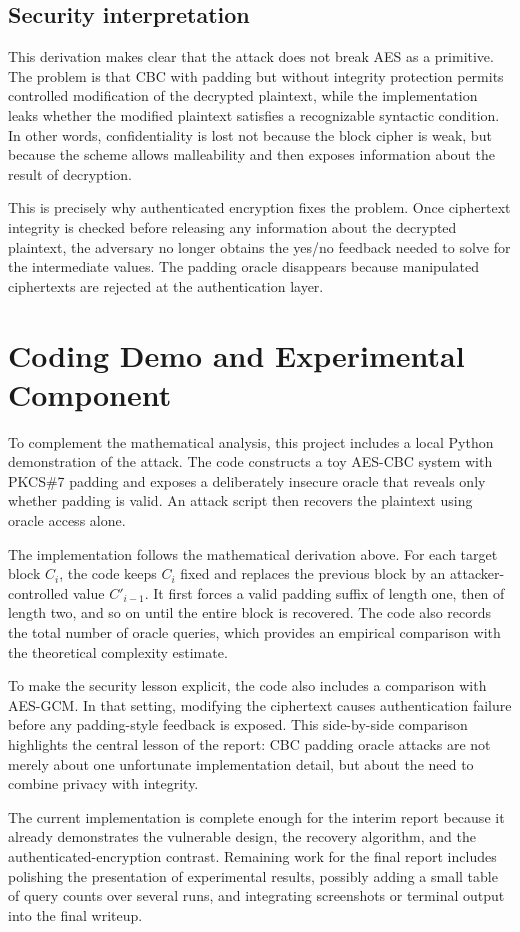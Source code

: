 \subsection{Security interpretation}

This derivation makes clear that the attack does not break AES as a primitive. The problem is that CBC with padding but without integrity protection permits controlled modification of the decrypted plaintext, while the implementation leaks whether the modified plaintext satisfies a recognizable syntactic condition. In other words, confidentiality is lost not because the block cipher is weak, but because the scheme allows malleability and then exposes information about the result of decryption.

This is precisely why authenticated encryption fixes the problem. Once ciphertext integrity is checked before releasing any information about the decrypted plaintext, the adversary no longer obtains the yes/no feedback needed to solve for the intermediate values. The padding oracle disappears because manipulated ciphertexts are rejected at the authentication layer.

\section{Coding Demo and Experimental Component}

To complement the mathematical analysis, this project includes a local Python demonstration of the attack. The code constructs a toy AES-CBC system with PKCS\#7 padding and exposes a deliberately insecure oracle that reveals only whether padding is valid. An attack script then recovers the plaintext using oracle access alone.

The implementation follows the mathematical derivation above. For each target block $C_i$, the code keeps $C_i$ fixed and replaces the previous block by an attacker-controlled value $C'_{i-1}$. It first forces a valid padding suffix of length one, then of length two, and so on until the entire block is recovered. The code also records the total number of oracle queries, which provides an empirical comparison with the theoretical complexity estimate.

To make the security lesson explicit, the code also includes a comparison with AES-GCM. In that setting, modifying the ciphertext causes authentication failure before any padding-style feedback is exposed. This side-by-side comparison highlights the central lesson of the report: CBC padding oracle attacks are not merely about one unfortunate implementation detail, but about the need to combine privacy with integrity.

The current implementation is complete enough for the interim report because it already demonstrates the vulnerable design, the recovery algorithm, and the authenticated-encryption contrast. Remaining work for the final report includes polishing the presentation of experimental results, possibly adding a small table of query counts over several runs, and integrating screenshots or terminal output into the final writeup.
